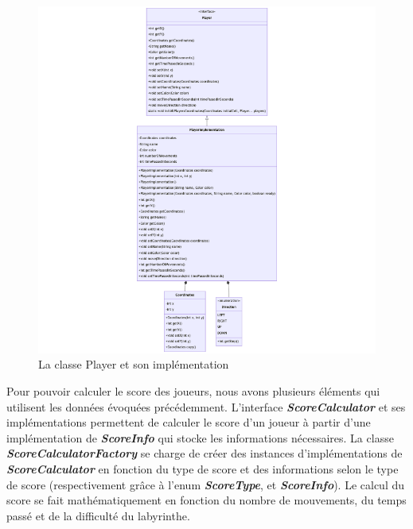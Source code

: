 \begin{figure}[H]
    \centering
    \includegraphics[width=15cm]{ressources/Implementation/Labyrinthe/Modele/Player.png}
    \caption{La classe Player et son implémentation}
    \label{fig:Player}
\end{figure}

Pour pouvoir calculer le score des joueurs, nous avons plusieurs éléments qui
utilisent les données évoquées précédemment. L'interface
\textbf{\textit{ScoreCalculator}} et ses implémentations permettent de calculer
le score d'un joueur à partir d'une implémentation de
\textbf{\textit{ScoreInfo}} qui stocke les informations nécessaires. La classe
\textbf{\textit{ScoreCalculatorFactory}} se charge de créer des instances
d'implémentations de \textbf{\textit{ScoreCalculator}} en fonction du type de
score et des informations selon le type de score (respectivement grâce à l'enum
\textbf{\textit{ScoreType}}, et \textbf{\textit{ScoreInfo}}). Le calcul du
score se fait mathématiquement en fonction du nombre de mouvements, du temps
passé et de la difficulté du labyrinthe.

